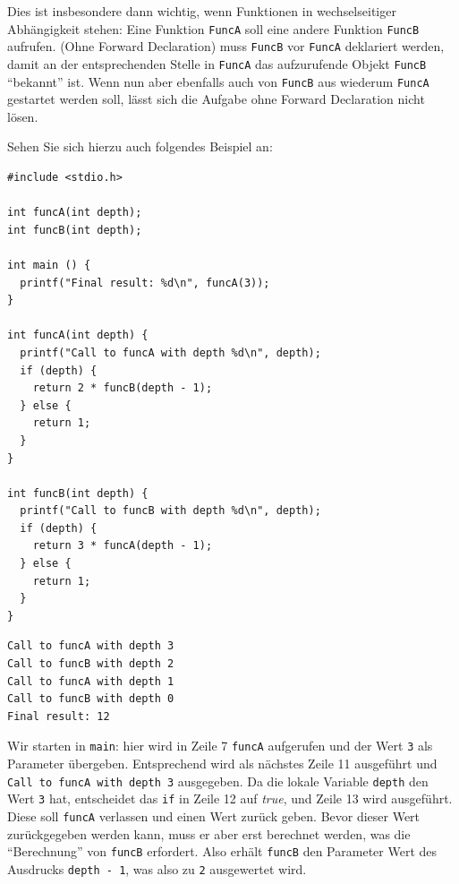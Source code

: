 Dies ist insbesondere dann wichtig, wenn Funktionen in wechselseitiger Abhängigkeit stehen: Eine Funktion \texttt{FuncA} soll eine andere Funktion \texttt{FuncB} aufrufen. (Ohne Forward Declaration) muss \texttt{FuncB} vor \texttt{FuncA} deklariert werden, damit an der entsprechenden Stelle in \texttt{FuncA} das aufzurufende Objekt \texttt{FuncB} \enquote{bekannt} ist. Wenn nun aber ebenfalls auch von \texttt{FuncB} aus wiederum \texttt{FuncA} gestartet werden soll, lässt sich die Aufgabe ohne Forward Declaration nicht lösen.

Sehen Sie sich hierzu auch folgendes Beispiel an:

\begin{codebox}
\begin{verbatim}
#include <stdio.h>

int funcA(int depth);
int funcB(int depth);

int main () {
  printf("Final result: %d\n", funcA(3));
}

int funcA(int depth) {
  printf("Call to funcA with depth %d\n", depth);
  if (depth) {
    return 2 * funcB(depth - 1);
  } else {
    return 1;
  }
}

int funcB(int depth) {
  printf("Call to funcB with depth %d\n", depth);
  if (depth) {
    return 3 * funcA(depth - 1);
  } else {
    return 1;
  }
}
\end{verbatim}
\end{codebox}

\begin{cmdbox}
\begin{verbatim}
Call to funcA with depth 3
Call to funcB with depth 2
Call to funcA with depth 1
Call to funcB with depth 0
Final result: 12
\end{verbatim}
\end{cmdbox}

Wir starten in \texttt{main}: hier wird in Zeile 7 \texttt{funcA} aufgerufen und der Wert \texttt{3} als Parameter übergeben. Entsprechend wird als nächstes Zeile 11 ausgeführt und \texttt{Call to funcA with depth 3} ausgegeben. Da die lokale Variable \texttt{depth} den Wert \texttt{3} hat, entscheidet das \texttt{if} in Zeile 12 auf \emph{true}, und Zeile 13 wird ausgeführt. Diese soll \texttt{funcA} verlassen und einen Wert zurück geben. Bevor dieser Wert zurückgegeben werden kann, muss er aber erst berechnet werden, was die \enquote{Berechnung} von \texttt{funcB} erfordert. Also erhält \texttt{funcB} den Parameter Wert des Ausdrucks \texttt{depth - 1}, was also zu \texttt{2} ausgewertet wird.

